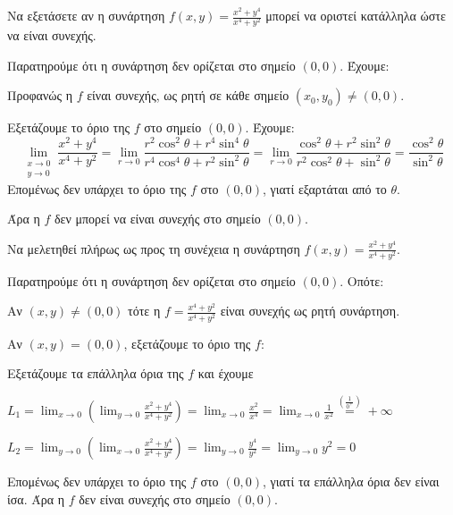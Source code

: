\begin{example}
  Να εξετάσετε αν η συνάρτηση $ f(x,y) = \frac{x^{2}+y^{4}}{x^{4}+y^{2}} $ μπορεί να 
  οριστεί κατάλληλα ώστε να είναι συνεχής.
  \begin{solution}
    Παρατηρούμε ότι η συνάρτηση δεν ορίζεται στο σημείο $ (0,0) $. Έχουμε:
    \begin{myitemize}
      \item Προφανώς η $f$ είναι συνεχής, ως ρητή σε κάθε σημείο 
        $ (x_{0}, y_{0}) \neq (0,0) $.  
      \item Εξετάζουμε το όριο της $f$ στο σημείο $ (0,0) $. Έχουμε:
        \[
          \lim\limits_{\substack{x\to 0 \\y \to 0}} \frac{x^{2}+y^{4}}{x^{4}+y^{2}} =
          \lim_{r \to 0} \frac{r^{2} \cos^{2}{\theta} + r^{4} 
          \sin^{4}{\theta}}{r^{4} \cos^{4}{\theta} + r^{2} \sin^{2}{\theta}} =
          \lim_{r \to 0} \frac{\cos^{2}{\theta} + r^{2} \sin^{2}{\theta}}{r^{2}
          \cos^{2}{\theta} + \sin^{2}{\theta}} =
          \frac{\cos^{2}{\theta}}{\sin^{2}{\theta}}
        \] 
        Επομένως δεν υπάρχει το όριο της $f$ στο $ (0,0) $, γιατί εξαρτάται από το
        $\theta$. 
    \end{myitemize}
    Άρα η $f$ δεν μπορεί να είναι συνεχής στο σημείο $(0,0)$.
  \end{solution}
\end{example}

\begin{example}
  Να μελετηθεί πλήρως ως προς τη συνέχεια η συνάρτηση 
  $ f(x,y) = \frac{x^{2}+y^{4}}{x^{4}+y^{2}} $.
  \begin{solution}
  \item {}
    Παρατηρούμε ότι η συνάρτηση δεν ορίζεται στο σημείο $ (0,0) $. Οπότε:

    Αν $ (x,y) \neq (0,0) $ τότε η $f= \frac{x^{4}+y^{2}}{x^{4}+y^{2}} $ είναι συνεχής 
    ως ρητή συνάρτηση.

    Αν $ (x,y)=(0,0) $, εξετάζουμε το όριο της $f$: 

    Εξετάζουμε τα επάλληλα όρια της $f$ και έχουμε
    \begin{myitemize}
      \item $ L_{1} = \lim_{x \to 0} 
        \left( 
          \lim_{y \to 0} \frac{x^{2}+y^{4}}{x^{4}+y^{2}} 
        \right) = \lim_{x \to 0} \frac{x^{2}}{x^{4}} = \lim_{x \to 0} \frac{1}{x^{2}}
        \overset{(\frac{1}{0^{+}})}{=} +\infty $
      \item $ L_{2} = \lim_{y \to 0} 
        \left(
          \lim_{x \to 0} 
          \frac{x^{2}+y^{4}}{x^{4}+y^{2}}
        \right) = \lim_{y \to 0} \frac{y^{4}}{y^{2}} = \lim_{y \to 0} y^{2} = 0 $
    \end{myitemize}
    Επομένως δεν υπάρχει το όριο της $f$ στο $ (0,0) $, γιατί τα επάλληλα όρια δεν 
    είναι ίσα.
    Άρα η $f$ δεν είναι συνεχής στο σημείο $(0,0)$.
  \end{solution}
\end{example}


